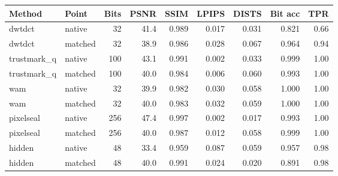 \begin{tabular}{llrrrrrrr}
\toprule
Method & Point & Bits & PSNR & SSIM & LPIPS & DISTS & Bit acc & TPR \\
\midrule
dwtdct & native & 32 & 41.4 & 0.989 & 0.017 & 0.031 & 0.821 & 0.66 \\
dwtdct & matched & 32 & 38.9 & 0.986 & 0.028 & 0.067 & 0.964 & 0.94 \\
trustmark\_q & native & 100 & 43.1 & 0.991 & 0.002 & 0.033 & 0.999 & 1.00 \\
trustmark\_q & matched & 100 & 40.0 & 0.984 & 0.006 & 0.060 & 0.993 & 1.00 \\
wam & native & 32 & 39.9 & 0.982 & 0.030 & 0.058 & 1.000 & 1.00 \\
wam & matched & 32 & 40.0 & 0.983 & 0.032 & 0.059 & 1.000 & 1.00 \\
pixelseal & native & 256 & 47.4 & 0.997 & 0.002 & 0.017 & 0.993 & 1.00 \\
pixelseal & matched & 256 & 40.0 & 0.987 & 0.012 & 0.058 & 0.999 & 1.00 \\
hidden & native & 48 & 33.4 & 0.959 & 0.087 & 0.059 & 0.957 & 0.98 \\
hidden & matched & 48 & 40.0 & 0.991 & 0.024 & 0.020 & 0.891 & 0.98 \\
\bottomrule
\end{tabular}
